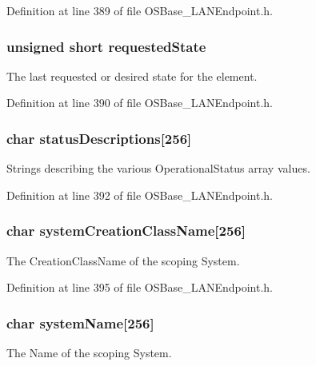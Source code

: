 Definition at line 389 of file OSBase\_\-LANEndpoint.h.\hypertarget{struct_l_a_n_endpoint_a8ef3ed2a286e0d72c33b29dfe265dba3}{
\subsubsection[{requestedState}]{\setlength{\rightskip}{0pt plus 5cm}unsigned short {\bf requestedState}}}
\label{struct_l_a_n_endpoint_a8ef3ed2a286e0d72c33b29dfe265dba3}
The last requested or desired state for the element. 

Definition at line 390 of file OSBase\_\-LANEndpoint.h.\hypertarget{struct_l_a_n_endpoint_a575445a261f8e7e135285a85d8263ee2}{
\subsubsection[{statusDescriptions}]{\setlength{\rightskip}{0pt plus 5cm}char {\bf statusDescriptions}\mbox{[}256\mbox{]}}}
\label{struct_l_a_n_endpoint_a575445a261f8e7e135285a85d8263ee2}
Strings describing the various OperationalStatus array values. 

Definition at line 392 of file OSBase\_\-LANEndpoint.h.\hypertarget{struct_l_a_n_endpoint_a71be5890bc11c2285607c8b4770d00ea}{
\subsubsection[{systemCreationClassName}]{\setlength{\rightskip}{0pt plus 5cm}char {\bf systemCreationClassName}\mbox{[}256\mbox{]}}}
\label{struct_l_a_n_endpoint_a71be5890bc11c2285607c8b4770d00ea}
The CreationClassName of the scoping System. 

Definition at line 395 of file OSBase\_\-LANEndpoint.h.\hypertarget{struct_l_a_n_endpoint_ab9c64e84d8e34eef2de9893fd0628af9}{
\subsubsection[{systemName}]{\setlength{\rightskip}{0pt plus 5cm}char {\bf systemName}\mbox{[}256\mbox{]}}}
\label{struct_l_a_n_endpoint_ab9c64e84d8e34eef2de9893fd0628af9}
The Name of the scoping System. 

